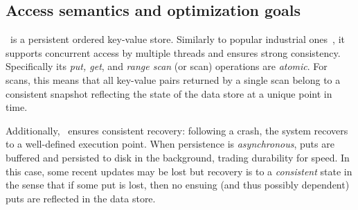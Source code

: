 \subsection{Access semantics and optimization goals}
\sys\ is a persistent ordered key-value store. Similarly to popular industrial ones~\cite{hbase,leveldb,RocksDB}, 
 it supports concurrent access by multiple threads and ensures 
strong consistency. 
Specifically its \emph{put, get}, and \emph{range scan} (or scan) operations are \emph{atomic}.  
For scans, this means that all key-value pairs returned by a single scan belong to a consistent 
snapshot reflecting the state of the data store at a unique point in time.

Additionally, \sys\ ensures {consistent recovery}: following a crash, the system recovers to a well-defined execution 
point.  
When persistence is \emph{asynchronous}, puts are buffered and persisted to disk in the background,  
 trading durability for speed. In this case, some recent updates may be lost but 
 recovery is to a \emph{consistent} state  
in the sense that if some put is lost, then no ensuing (and thus possibly dependent) puts are reflected in the data store.


